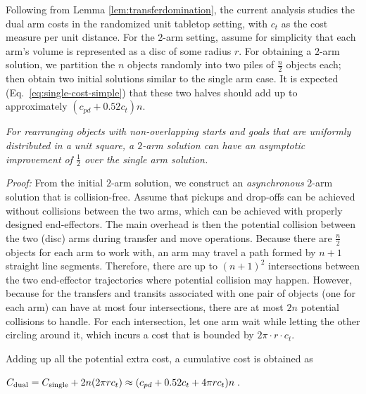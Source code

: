 
Following from Lemma \ref{lem:transferdomination}, the current analysis studies the dual arm costs in the randomized unit tabletop setting, with $c_t$ as the cost measure per unit distance. 
For the $2$-arm setting, assume for simplicity that each arm's volume is represented as a disc of some radius 
$r$. For obtaining a $2$-arm solution, we partition the $n$ objects randomly 
into two piles of $\frac{n}{2}$ objects each; then obtain two initial solutions 
similar to the single arm case. It is expected (Eq.~\ref{eq:single-cost-simple}) that these two halves 
should add up to approximately $(c_{pd} + 0.52c_t)n$. 


\begin{theorem}
	\textit{For rearranging objects with non-overlapping starts and goals that are
	uniformly distributed in a unit square,  a $2$-arm solution can have an 
	asymptotic improvement of $\frac{1}{2}$ over the single arm solution. }
	\label{thm:karm}
\end{theorem}

\textit{Proof: }
From the initial $2$-arm solution, we construct an {\em asynchronous} $2$-arm 
solution that is collision-free. Assume that pickups 
and drop-offs can be achieved without collisions between the two arms, which 
can be achieved with properly designed end-effectors. The main overhead 
is then the potential collision between the two (disc) arms during transfer 
and move operations. Because there are $\frac{n}{2}$ objects for each arm to work 
with, an arm may travel a path formed by $n + 1$ straight line 
segments. Therefore, there are up to $(n + 1)^2$ intersections between the 
two end-effector trajectories where potential collision may happen. However,
because for the transfers and transits associated with one pair of objects (one 
for each arm) can have at most four intersections, there are at most 
$2n$ potential collisions to handle. For each intersection, let one 
arm wait while letting the other circling around it, which incurs a cost that is bounded by $2\pi \cdot
r \cdot c_t$. 


Adding up all the potential extra cost,  
a cumulative cost is obtained as 

{\centerline
{
$C_{\rm dual} = C_{\rm single} + 2n(2\pi rc_t) \approx (c_{pd} + 0.52c_t + 4\pi rc_t)n\;.$
}
}

